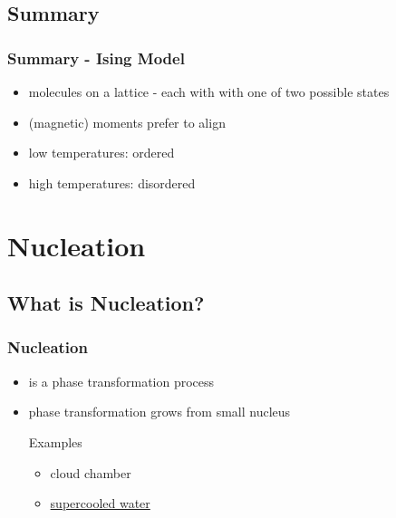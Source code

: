 \documentclass{beamer}
\begin{document}
\subsection{Summary}
\begin{frame}\frametitle{Summary - Ising Model}
\begin{itemize}
\item molecules on a lattice - each with with one of two possible states
\item (magnetic) moments prefer to align
\item low temperatures: ordered
\item high temperatures: disordered
\end{itemize}
\end{frame}


\section{Nucleation}
\subsection{What is Nucleation?}
\begin{frame}\frametitle{Nucleation}
\begin{itemize}
\item is a phase transformation process
\item phase transformation grows from small nucleus
\begin{exampleblock}{Examples}
\begin{itemize}
\item cloud chamber
\item \href{http://www.youtube.com/watch?v=pTdiTe3x0Bo}{supercooled water}
\end{itemize}
\end{exampleblock}
\end{itemize}
\end{frame}
\end{document}
